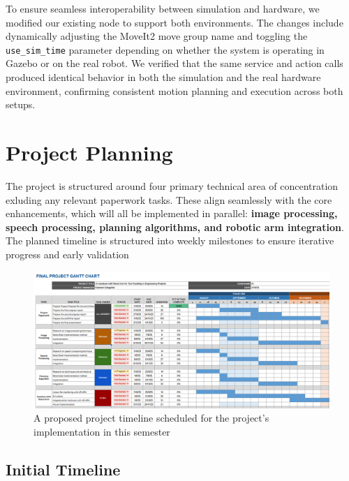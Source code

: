 \documentclass[12pt]{extarticle}
\begin{document}
To ensure seamless interoperability between simulation and hardware, we modified our existing node to support both environments. The changes include dynamically adjusting the MoveIt2 move group name and toggling the \texttt{use\_sim\_time} parameter depending on whether the system is operating in Gazebo or on the real robot. We verified that the same service and action calls produced identical behavior in both the simulation and the real hardware environment, confirming consistent motion planning and execution across both setups.

\newpage
\section{Project Planning}
The project is structured around four primary technical area of concentration exluding any relevant paperwork tasks. These align seamlessly with the core enhancements, which will all be implemented in parallel: \textbf{image processing, speech processing, planning algorithms, and robotic arm integration}.  The planned timeline is structured into weekly milestones to ensure iterative progress and early validation 

\begin{figure}[htbp]
    \centering
    \includegraphics[width=0.8\linewidth]{images/Gantt_chart(2).png}
    \caption{A proposed project timeline scheduled for the project’s implementation in this semester}
    \label{fig:gantt-chart}
\end{figure}

\subsection{Initial Timeline}
\end{document}
